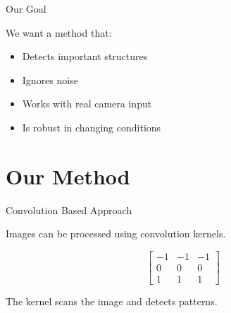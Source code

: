 \documentclass{beamer}
\begin{document}


\begin{frame}{Our Goal}


    We want a method that:

    \begin{itemize}

        \item Detects important structures

        \item Ignores noise

        \item Works with real camera input

        \item Is robust in changing conditions

    \end{itemize}


\end{frame}




\section{Our Method}


\begin{frame}{Convolution Based Approach}


    Images can be processed using convolution kernels.


    \[
        \begin{bmatrix}
            -1 & -1 & -1 \\
            0  & 0  & 0  \\
            1  & 1  & 1
        \end{bmatrix}
    \]


    The kernel scans the image and detects patterns.


\end{frame}



\end{document}
